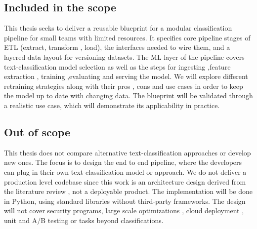 \subsection{Included in the scope}
\label{sec:scope}
This thesis seeks to deliver a reusable blueprint for a modular classification pipeline for small teams with limited resources. It specifies core pipeline stages of ETL (extract, transform , load), the interfaces needed to wire them, and a layered data layout for versioning datasets. The ML layer of the pipeline covers text-classification model selection as well as the steps for ingesting ,feature extraction ,  training ,evaluating  and serving the model. We will explore different retraining strategies along with their pros , cons and use cases in order to keep the model up to date with changing data. The blueprint will be validated through a realistic use case, which will demonstrate its applicability in practice.

\subsection{Out of scope}
\label{sec:out_of_scope}
This thesis does not compare alternative text-classification approaches or develop new ones. The focus is to design the end to end pipeline, where the developers can plug in their own text-classification model or approach. We do not deliver a production level codebase since this work is an architecture design derived from the literature review , not a deployable product. The implementation will be done in Python, using standard libraries without third-party frameworks. The design will not cover security programs, large scale optimizations , cloud deployment , unit and A/B testing or tasks beyond classifications.


